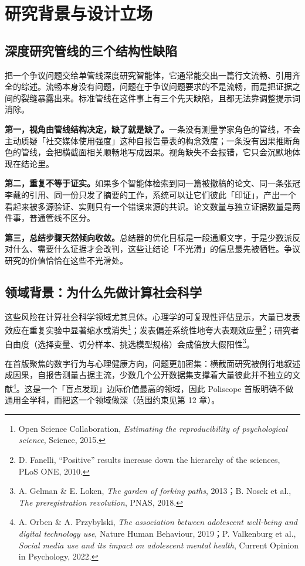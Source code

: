 \section{研究背景与设计立场}

\subsection{深度研究管线的三个结构性缺陷}

把一个争议问题交给单管线深度研究智能体，它通常能交出一篇行文流畅、引用齐全的综述。流畅本身没有问题，问题在于争议问题要求的不是流畅，而是把证据之间的裂缝暴露出来。标准管线在这件事上有三个先天缺陷，且都无法靠调整提示词消除。

\textbf{第一，视角由管线结构决定，缺了就是缺了。}一条没有测量学家角色的管线，不会主动质疑「社交媒体使用强度」这种自报告量表的构念效度；一条没有因果推断角色的管线，会把横截面相关顺畅地写成因果。视角缺失不会报错，它只会沉默地体现在结论里。

\textbf{第二，重复不等于证实。}如果多个智能体检索到同一篇被撤稿的论文、同一条张冠李戴的引用、同一份只发了摘要的工作，系统可以让它们彼此「印证」，产出一个看起来被多源验证、实则只有一个错误来源的共识。论文数量与独立证据数量是两件事，普通管线不区分。

\textbf{第三，总结步骤天然倾向收敛。}总结器的优化目标是一段通顺文字，于是少数派反对什么、需要什么证据才会改判，这些让结论「不光滑」的信息最先被牺牲。争议研究的价值恰恰在这些不光滑处。

\subsection{领域背景：为什么先做计算社会科学}

这些风险在计算社会科学领域尤其具体。心理学的可复现性评估显示，大量已发表效应在重复实验中显著缩水或消失\footnote{Open Science Collaboration, \emph{Estimating the reproducibility of psychological science}, Science, 2015.}；发表偏差系统性地夸大表观效应量\footnote{D. Fanelli, ``Positive'' results increase down the hierarchy of the sciences, PLoS ONE, 2010.}；研究者自由度（选择变量、切分样本、挑选模型规格）会成倍放大假阳性\footnote{A. Gelman \& E. Loken, \emph{The garden of forking paths}, 2013；B. Nosek et al., \emph{The preregistration revolution}, PNAS, 2018.}。

在首版聚焦的数字行为与心理健康方向，问题更加密集：横截面研究被例行地叙述成因果，自报告测量占据主流，少数几个公开数据集支撑着大量彼此并不独立的文献\footnote{A. Orben \& A. Przybylski, \emph{The association between adolescent well-being and digital technology use}, Nature Human Behaviour, 2019；P. Valkenburg et al., \emph{Social media use and its impact on adolescent mental health}, Current Opinion in Psychology, 2022.}。这是一个「盲点发现」边际价值最高的领域，因此 Poliscope 首版明确不做通用全学科，而把这一个领域做深（范围约束见第 12 章）。

